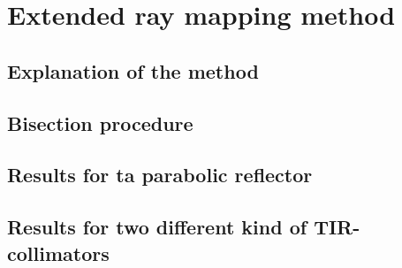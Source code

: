 \chapter{Extended ray mapping method}


\section{Explanation of the method}
\section{Bisection procedure}
\section{Results for ta parabolic reflector}
\section{Results for two different kind of TIR-collimators}